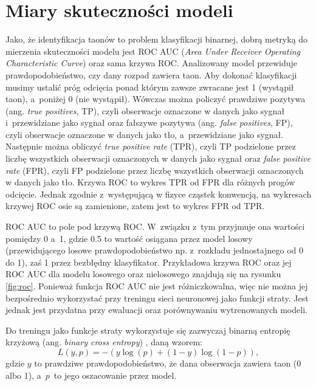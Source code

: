 \documentclass{pracalicmgr}
\begin{document}
	\section{Miary skuteczności modeli}
	Jako, że identyfikacja taonów to problem klasyfikacji binarnej, dobrą metryką do mierzenia skuteczności modelu jest ROC AUC (\textit{Area Under Receiver Operating Characteristic Curve}) oraz sama krzywa ROC. Analizowany model przewiduje prawdopodobieństwo, czy dany rozpad zawiera taon. Aby dokonać klasyfikacji musimy ustalić próg odcięcia ponad którym zawsze zwracane jest 1 (wystąpił taon), a~poniżej 0 (nie wystąpił). Wówczas można policzyć prawdziwe pozytywa (ang. \textit{true positives}, TP), czyli obserwacje oznaczone w danych jako sygnał i~przewidziane jako sygnał oraz fałszywe pozytywa (ang. \textit{false positives}, FP), czyli obserwacje oznaczone w danych jako tło, a~przewidziane jako sygnał. Następnie można obliczyć \textit{true positive rate} (TPR), czyli TP podzielone przez liczbę wszystkich obserwacji oznaczonych w danych jako sygnał oraz \textit{false positive rate} (FPR), czyli FP podzielone przez liczbę wszystkich obserwacji oznaczonych w danych jako tło. Krzywa ROC to wykres TPR od FPR dla różnych progów odcięcie. Jednak zgodnie z~występującą w fizyce cząstek konwencją, na wykresach krzywej ROC osie są zamienione, zatem jest to wykres FPR od TPR. 
	
	ROC AUC to pole pod krzywą ROC. W~związku z~tym przyjmuje ona wartości pomiędzy 0 a~1, gdzie 0.5 to wartość osiągana przez model losowy (przewidującego losowe prawdopodobieństwo np. z~rozkładu jednostajnego od 0 do 1), zaś 1 przez bezbłędny klasyfikator. Przykładowa krzywa ROC oraz jej ROC AUC dla modelu losowego oraz nielosowego znajdują się na rysunku \ref{fig:roc}. Ponieważ funkcja ROC AUC nie jest różniczkowalna, więc nie można jej bezpośrednio wykorzystać przy treningu sieci neuronowej jako funkcji straty. Jest jednak jest przydatna przy ewaluacji oraz porównywaniu wytrenowanych modeli.
	
	Do treningu jako funkcje straty wykorzystuje się zazwyczaj binarną entropię krzyżową (ang. \textit{binary cross entropy}) \cite{dl}, daną wzorem: $$ L(y, p) = -(y\log(p)+(1-y)\log(1-p)),$$ gdzie $y$ to prawdziwe prawdopodobieństwo, że dana obserwacja zawiera taon (0 albo 1), a~$p$~to jego oszacowanie przez model.
\end{document}
